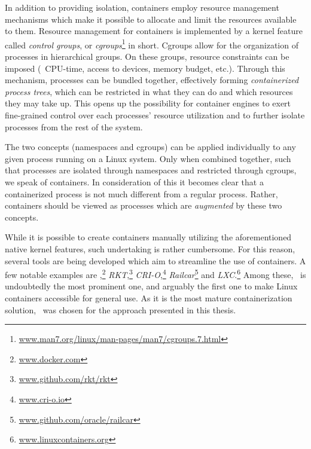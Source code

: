 In addition to providing isolation, containers employ resource management mechanisms which make it possible to allocate and limit the resources available to them. Resource management for containers is implemented by a kernel feature called \emph{control groups}, or \emph{cgroups}\footnote{\url{www.man7.org/linux/man-pages/man7/cgroups.7.html}} in short. Cgroups allow for the organization of processes in hierarchical groups. On these groups, resource constraints can be imposed (\eg\ CPU-time, access to devices, memory budget, etc.).
Through this mechanism, processes can be bundled together, effectively forming \emph{containerized process trees}, which can be restricted in what they can do and which resources they may take up. This opens up the possibility for container engines to exert fine-grained control over each processes' resource utilization and to further isolate processes from the rest of the system.

The two concepts (namespaces and cgroups) can be applied individually to any given process running on a Linux system. Only when combined together, such that processes are isolated through namespaces and restricted through cgroups, we speak of containers. In consideration of this it becomes clear that a containerized process is not much different from a regular process. Rather, containers should be viewed as processes which are \emph{augmented} by these two concepts.


While it is possible to create containers manually utilizing the aforementioned native kernel features, such undertaking is rather cumbersome. For this reason, several tools are being developed which aim to streamline the use of containers. A few notable examples are \emph{\docker},\footnote{\url{www.docker.com}} \emph{RKT},\footnote{\url{www.github.com/rkt/rkt}} \emph{CRI-O},\footnote{\url{www.cri-o.io}} \emph{Railcar}\footnote{\url{www.github.com/oracle/railcar}} and \emph{LXC}.\footnote{\url{www.linuxcontainers.org}} Among these,  \docker\ is undoubtedly the most prominent one, and arguably the first one to make Linux containers accessible for general use. As it is the most mature containerization solution, \docker\ was chosen for the approach presented in this thesis.


